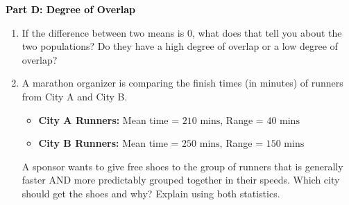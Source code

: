 \documentclass[12pt, letterpaper, fleqn]{article}
\begin{document}
\newpage

\begin{tcolorbox}[colback=customteal!20]
\large\textcolor{black}{\textbf{Part D: Degree of Overlap}}
\end{tcolorbox}

\vspace{3mm}

\begin{enumerate}[itemsep=5.5cm, leftmargin=0.6cm, resume]
\item If the difference between two means is $0$, what does that tell you about the two populations? Do they have a high degree of overlap or a low degree of overlap?
\item A marathon organizer is comparing the finish times (in minutes) of runners from City A and City B.
\begin{itemize}
\item \textbf{City A Runners:} Mean time = $210\text{ mins}$, Range = $40\text{ mins}$
\item \textbf{City B Runners:} Mean time = $250\text{ mins}$, Range = $150\text{ mins}$
\end{itemize}
A sponsor wants to give free shoes to the group of runners that is generally faster AND more predictably grouped together in their speeds. Which city should get the shoes and why? Explain using both statistics.
\end{enumerate}
\end{document}
